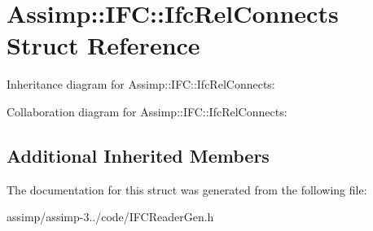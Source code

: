 \hypertarget{struct_assimp_1_1_i_f_c_1_1_ifc_rel_connects}{\section{Assimp\+:\+:I\+F\+C\+:\+:Ifc\+Rel\+Connects Struct Reference}
\label{struct_assimp_1_1_i_f_c_1_1_ifc_rel_connects}
}


Inheritance diagram for Assimp\+:\+:I\+F\+C\+:\+:Ifc\+Rel\+Connects\+:


Collaboration diagram for Assimp\+:\+:I\+F\+C\+:\+:Ifc\+Rel\+Connects\+:
\subsection*{Additional Inherited Members}


The documentation for this struct was generated from the following file\+:\begin{DoxyCompactItemize}
\item 
assimp/assimp-\/3../code/I\+F\+C\+Reader\+Gen.\+h\end{DoxyCompactItemize}
